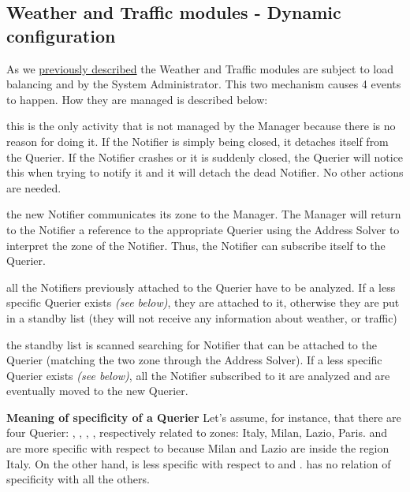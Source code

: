 \subsection{Weather and Traffic modules - Dynamic configuration}
	\label{sect:WeatherTrafficAlgorithm}
	As we \hyperref[sect:WeatherTrafficModules]{previously described} the Weather and Traffic modules are subject to load balancing and  by the System Administrator. This two mechanism causes 4 events to happen. How they are managed is described below:
	\begin{description}[before={\renewcommand{\makelabel}[1]{-- \textit{##1}:}}]
		\item[a Notifier is deleted] this is the only activity that is not managed by the Manager because there is no reason for doing it. If the Notifier is simply being closed, it detaches itself from the Querier. If the Notifier crashes or it is suddenly closed, the Querier will notice this when trying to notify it and it will detach the dead Notifier. No other actions are needed.
		\item[a Notifier is created] the new Notifier communicates its zone to the Manager. The Manager will return to the Notifier a reference to the appropriate Querier using the Address Solver to interpret the zone of the Notifier. Thus, the Notifier can subscribe itself to the Querier.
		\item[Quierier is deleted] all the Notifiers previously attached to the Querier have to be analyzed. If a less specific Querier exists \textit{(see below)}, they are attached to it, otherwise they are put in a standby list (they will not receive any information about weather, or traffic)
		\item[a new Querier is instantiated] the standby list is scanned searching for Notifier that can be attached to the Querier (matching the two zone through the Address Solver). If a less specific Querier exists \textit{(see below)}, all the Notifier subscribed to it are analyzed and are eventually moved to the new Querier.
	\end{description}
	\medskip
	\textbf{Meaning of specificity of a Querier}\newline
	Let's assume, for instance, that there are four Querier: , , , , respectively related to zones: Italy, Milan, Lazio, Paris.  and  are more specific with respect to  because Milan and Lazio are inside the region Italy. On the other hand,  is less specific with respect to  and .  has no relation of specificity with all the others.\newline
